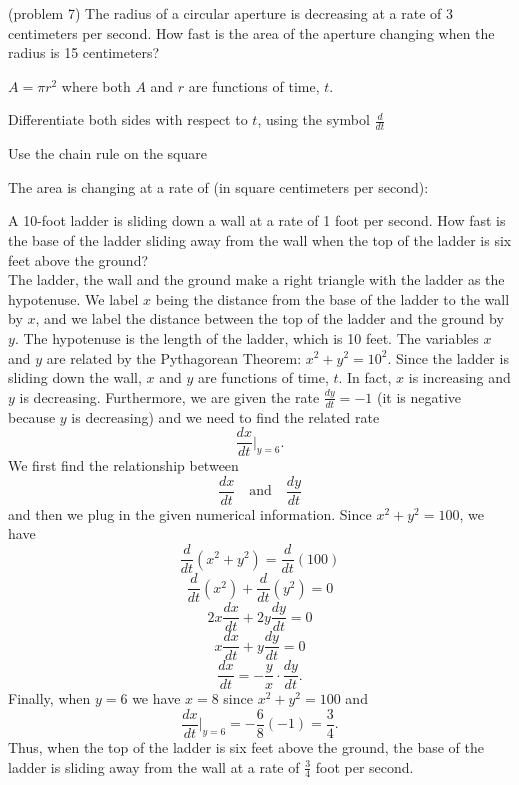 \documentclass[handout]{ximera}
\begin{document}
\begin{problem}(problem 7)
The radius of a circular aperture is decreasing at a rate of 3 centimeters per second.  
How fast is the area of the aperture changing when the radius is 15 centimeters?

\begin{hint}
$A = \pi r^2$ where both $A$ and $r$ are functions of time, $t$.
\end{hint}

\begin{hint}
Differentiate both sides with respect to $t$, using the symbol $\frac{d}{dt}$
\end{hint}
\begin{hint}
Use the chain rule on the square
\end{hint}

The area is changing at a rate of (in square centimeters per second):
\begin{multipleChoice}
\choice{$90 \pi$}
\choice[correct]{$-90 \pi$}
\choice{$-120 \pi$}
\end{multipleChoice}
\end{problem}


\begin{example}[example 8]
A 10-foot ladder is sliding down a wall at a rate of 1 foot per second.  How fast is the base of the 
ladder sliding away from the wall when the top of the ladder is six feet above the ground?\\
 The ladder, the wall and the ground make a right triangle with the ladder as the hypotenuse.  
We label $x$ being the distance from the base of the ladder 
to the wall by $x$, and we label  the distance between the top of the ladder and the ground by $y$. 
The hypotenuse is the length of the
ladder, which is 10 feet. The variables $x$ and $y$ are related by the 
Pythagorean Theorem: $x^2 + y^2 = 10^2$. Since the ladder is
sliding down the wall, $x$ and $y$ are functions of time, $t$. 
In fact, $x$ is increasing and $y$ is decreasing. Furthermore, we are given 
the rate $\frac{dy}{dt} = -1$ (it is negative because $y$ is decreasing)
and we need to find the related rate
\[\frac{dx}{dt}\bigg|_{y = 6}.\]
We first find the relationship between 
\[\frac{dx}{dt} \quad \text{and} \quad \frac{dy}{dt}\]
and then we plug in the given numerical information.
Since $x^2 + y^2 = 100$, we have
\[\frac{d}{dt} (x^2 + y^2 ) = \frac{d}{dt}(100)\]
\[\frac{d}{dt} (x^2) +\frac{d}{dt}(y^2 ) = 0\]
\[2x\frac{dx}{dt} + 2y\frac{dy}{dt} = 0\]
\[x\frac{dx}{dt} + y\frac{dy}{dt} = 0\]
\[\frac{dx}{dt} =- \frac{y}{x}\cdot \frac{dy}{dt}. \]
Finally, when $y= 6$ we have $x=8$ since $x^2 + y^2 = 100$ and
\[\frac{dx}{dt}\bigg|_{y = 6}= -\frac68 (-1) = \frac34.\]
Thus, when the top of the ladder is six feet above the ground, 
the base of the ladder is sliding away from the wall 
at a rate of $\frac34$ foot per second.

\begin{center}
\end{center}






\end{example}
\end{document}
